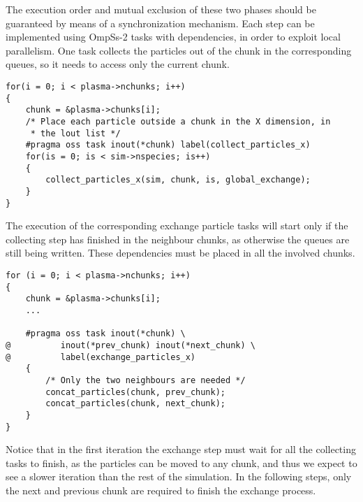 The execution order and mutual exclusion of these two phases should be 
guaranteed by means of a synchronization mechanism. Each step can be implemented 
using OmpSs-2 tasks with dependencies, in order to exploit local parallelism.  
One task collects the particles out of the chunk in the corresponding queues, so 
it needs to access only the current chunk.
%
\begin{lstlisting}[caption={Collect particles in the X direction.}]%{{{
for(i = 0; i < plasma->nchunks; i++)
{
	chunk = &plasma->chunks[i];
	/* Place each particle outside a chunk in the X dimension, in
	 * the lout list */
	#pragma oss task inout(*chunk) label(collect_particles_x)
	for(is = 0; is < sim->nspecies; is++)
	{
		collect_particles_x(sim, chunk, is, global_exchange);
	}
}
\end{lstlisting}%
%
The execution of the corresponding exchange particle tasks will start only if 
the collecting step has finished in the neighbour chunks, as otherwise the 
queues are still being written. These dependencies must be placed in all the 
involved chunks.
%
\begin{lstlisting}[caption={Exchange of particles in X}]%{{{
for (i = 0; i < plasma->nchunks; i++)
{
	chunk = &plasma->chunks[i];
	...

	#pragma oss task inout(*chunk) \
@          inout(*prev_chunk) inout(*next_chunk) \
@          label(exchange_particles_x)
	{
		/* Only the two neighbours are needed */
		concat_particles(chunk, prev_chunk);
		concat_particles(chunk, next_chunk);
	}
}
\end{lstlisting}%
%
Notice that in the first iteration the exchange step must wait for all the 
collecting tasks to finish, as the particles can be moved to any chunk, and thus 
we expect to see a slower iteration than the rest of the simulation. In the 
following steps, only the next and previous chunk are required to finish the 
exchange process.


